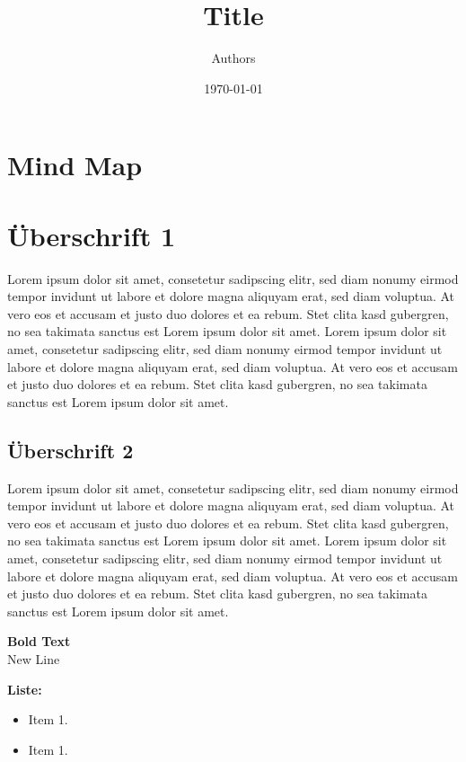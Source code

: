 \documentclass{article}
\title{Title}									%
\author{Authors}								%
\date{\today}														%
\begin{document}

\maketitle 										%
\thispagestyle{fancy}							%


\tableofcontents 

\pagebreak

\section{Mind Map}
\pagebreak


\section{Überschrift 1}
Lorem ipsum dolor sit amet, consetetur sadipscing elitr, sed diam nonumy eirmod tempor invidunt ut labore et dolore magna aliquyam erat, sed diam voluptua. At vero eos et accusam et justo duo dolores et ea rebum. Stet clita kasd gubergren, no sea takimata sanctus est Lorem ipsum dolor sit amet. Lorem ipsum dolor sit amet, consetetur sadipscing elitr, sed diam nonumy eirmod tempor invidunt ut labore et dolore magna aliquyam erat, sed diam voluptua. At vero eos et accusam et justo duo dolores et ea rebum. Stet clita kasd gubergren, no sea takimata sanctus est Lorem ipsum dolor sit amet.

\subsection{Überschrift 2}
Lorem ipsum dolor sit amet, consetetur sadipscing elitr, sed diam nonumy eirmod tempor invidunt ut labore et dolore magna aliquyam erat, sed diam voluptua. At vero eos et accusam et justo duo dolores et ea rebum. Stet clita kasd gubergren, no sea takimata sanctus est Lorem ipsum dolor sit amet. Lorem ipsum dolor sit amet, consetetur sadipscing elitr, sed diam nonumy eirmod tempor invidunt ut labore et dolore magna aliquyam erat, sed diam voluptua. At vero eos et accusam et justo duo dolores et ea rebum. Stet clita kasd gubergren, no sea takimata sanctus est Lorem ipsum dolor sit amet.

\textbf{Bold Text} \\
New Line


\textbf{Liste:}
\begin{itemize}
	\item Item 1. 
	\item Item 1. 
\end{itemize}
\end{document}
